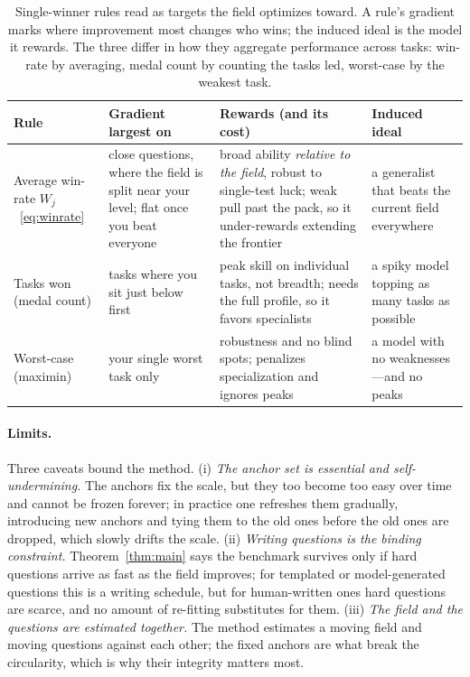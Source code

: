 \documentclass[11pt]{article}
\theoremstyle{plain}
\theoremstyle{definition}
\theoremstyle{remark}
\begin{document}
\begin{table}[t]
\centering
\small
\begin{tabular}{@{}p{}p{}p{}p{}@{}}
\toprule
\textbf{Rule} & \textbf{Gradient largest on} & \textbf{Rewards (and its cost)} & \textbf{Induced ideal}\\
\midrule
Average win-rate $W_j$~\eqref{eq:winrate} &
close questions, where the field is split near your level; flat once you beat everyone &
broad ability \emph{relative to the field}, robust to single-test luck; weak pull past the pack, so it under-rewards extending the frontier &
a generalist that beats the current field everywhere\\[3pt]
Tasks won (medal count) &
tasks where you sit just below first &
peak skill on individual tasks, not breadth; needs the full profile, so it favors specialists &
a spiky model topping as many tasks as possible\\[3pt]
Worst-case (maximin) &
your single worst task only &
robustness and no blind spots; penalizes specialization and ignores peaks &
a model with no weaknesses---and no peaks\\
\bottomrule
\end{tabular}
\caption{Single-winner rules read as targets the field optimizes toward. A rule's
gradient marks where improvement most changes who wins; the induced ideal is the
model it rewards. The three differ in how they aggregate performance across tasks:
win-rate by averaging, medal count by counting the tasks led, worst-case by the
weakest task.}
\label{tab:rules}
\end{table}

\paragraph{Limits.} Three caveats bound the method. (i) \emph{The anchor set is
essential and self-undermining.} The anchors fix the scale, but they too become too
easy over time and cannot be frozen forever; in practice one refreshes them
gradually, introducing new anchors and tying them to the old ones before the old ones
are dropped, which slowly drifts the scale. (ii) \emph{Writing questions is the
binding constraint.} Theorem~\ref{thm:main} says the benchmark survives only if hard
questions arrive as fast as the field improves; for templated or model-generated
questions this is a writing schedule, but for human-written ones hard questions are
scarce, and no amount of re-fitting substitutes for them. (iii) \emph{The field and
the questions are estimated together.} The method estimates a moving field and
moving questions against each other; the fixed anchors are what break the
circularity, which is why their integrity matters most.
\end{document}

